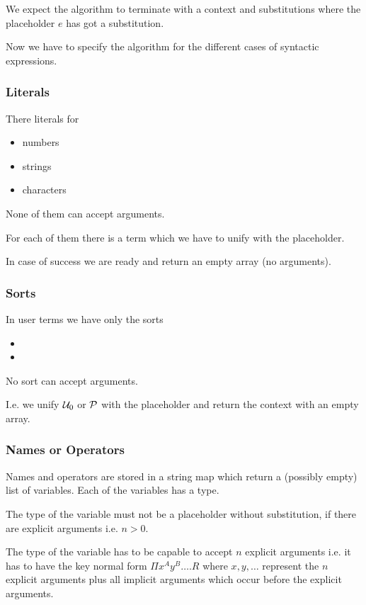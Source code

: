 We expect the algorithm to terminate with a context and substitutions where
the placeholder $e$ has got a substitution.


Now we have to specify the algorithm for the different cases of syntactic
expressions.


\subsubsection{Literals}

There literals for
\begin{itemize}
\item numbers
\item strings
\item characters
\end{itemize}

None of them can accept arguments.

For each of them there is a term which we have to unify with the placeholder.

In case of success we are ready and return an empty array (no arguments).



\subsubsection{Sorts}

In user terms we have only the sorts
\begin{itemize}
\item {}
\item {}
\end{itemize}

No sort can accept arguments.

I.e. we unify ${\cal{U}}_0$ or ${\cal{P}}$ with the placeholder and return the context
with an empty array.




\subsubsection{Names or Operators}

Names and operators are stored in a string map which return a (possibly empty)
list of variables. Each of the variables has a type.

The type of the variable must not be a placeholder without substitution, if
there are explicit arguments i.e. $n > 0$.

The type of the variable has to be capable to accept $n$ explicit arguments
i.e. it has to have the key normal form $\Pi x^A y^B \ldots . R$ where $x, y,
\ldots$ represent the $n$ explicit arguments plus all implicit arguments which
occur before  the explicit arguments.

